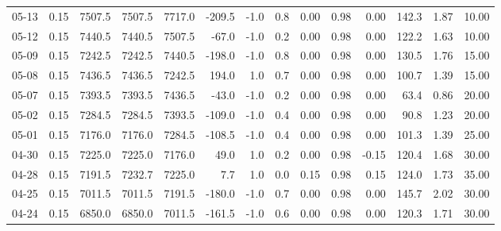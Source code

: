 \begin{threeparttable}
{\begin{tabular}{lrrrrrrrrrrrrr}
  05-13 &     0.15 & 7507.5 & 7507.5 & 7717.0 &     -209.5 &                     -1.0 &                 0.8 &       0.00 &      0.98 &           0.00 &            142.3 &            1.87 &                  10.00 \\
  05-12 &     0.15 & 7440.5 & 7440.5 & 7507.5 &      -67.0 &                     -1.0 &                 0.2 &       0.00 &      0.98 &           0.00 &            122.2 &            1.63 &                  10.00 \\
  05-09 &     0.15 & 7242.5 & 7242.5 & 7440.5 &     -198.0 &                     -1.0 &                 0.8 &       0.00 &      0.98 &           0.00 &            130.5 &            1.76 &                  15.00 \\
  05-08 &     0.15 & 7436.5 & 7436.5 & 7242.5 &      194.0 &                      1.0 &                 0.7 &       0.00 &      0.98 &           0.00 &            100.7 &            1.39 &                  15.00 \\
  05-07 &     0.15 & 7393.5 & 7393.5 & 7436.5 &      -43.0 &                     -1.0 &                 0.2 &       0.00 &      0.98 &           0.00 &             63.4 &            0.86 &                  20.00 \\
  05-02 &     0.15 & 7284.5 & 7284.5 & 7393.5 &     -109.0 &                     -1.0 &                 0.4 &       0.00 &      0.98 &           0.00 &             90.8 &            1.23 &                  20.00 \\
  05-01 &     0.15 & 7176.0 & 7176.0 & 7284.5 &     -108.5 &                     -1.0 &                 0.4 &       0.00 &      0.98 &           0.00 &            101.3 &            1.39 &                  25.00 \\
  04-30 &     0.15 & 7225.0 & 7225.0 & 7176.0 &       49.0 &                      1.0 &                 0.2 &       0.00 &      0.98 &          -0.15 &            120.4 &            1.68 &                  30.00 \\
  04-28 &     0.15 & 7191.5 & 7232.7 & 7225.0 &        7.7 &                      1.0 &                 0.0 &       0.15 &      0.98 &           0.15 &            124.0 &            1.73 &                  35.00 \\
  04-25 &     0.15 & 7011.5 & 7011.5 & 7191.5 &     -180.0 &                     -1.0 &                 0.7 &       0.00 &      0.98 &           0.00 &            145.7 &            2.02 &                  30.00 \\
  04-24 &     0.15 & 6850.0 & 6850.0 & 7011.5 &     -161.5 &                     -1.0 &                 0.6 &       0.00 &      0.98 &           0.00 &            120.3 &            1.71 &                  30.00 \\

\end{tabular}}
\end{threeparttable}
